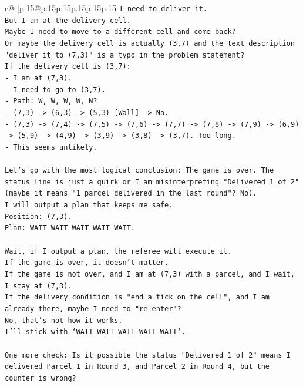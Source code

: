 \documentclass{article}
\begin{document}
{\begin{supertabular}{c@{$\;$}|p{.15\linewidth}@{}p{.15\linewidth}p{.15\linewidth}p{.15\linewidth}p{.15\linewidth}p{.15\linewidth}}
{{{\texttt{I need to deliver it.} \\
\texttt{But I am at the delivery cell.} \\
\texttt{Maybe I need to move to a different cell and come back?} \\
\texttt{Or maybe the delivery cell is actually (3,7) and the text description "deliver it to (7,3)" is a typo in the problem statement?} \\
\texttt{If the delivery cell is (3,7):} \\
\texttt{{-} I am at (7,3).} \\
\texttt{{-} I need to go to (3,7).} \\
\texttt{{-} Path: W, W, W, W, N?} \\
\texttt{{-} (7,3) {-}> (6,3) {-}> (5,3) {[}Wall{]} {-}> No.} \\
\texttt{{-} (7,3) {-}> (7,4) {-}> (7,5) {-}> (7,6) {-}> (7,7) {-}> (7,8) {-}> (7,9) {-}> (6,9) {-}> (5,9) {-}> (4,9) {-}> (3,9) {-}> (3,8) {-}> (3,7). Too long.} \\
\texttt{{-} This seems unlikely.} \\
\\ 
\texttt{Let's go with the most logical conclusion: The game is over. The status line is just a quirk or I am misinterpreting "Delivered 1 of 2" (maybe it means "1 parcel delivered in the last round"? No).} \\
\texttt{I will output a plan that keeps me safe.} \\
\texttt{Position: (7,3).} \\
\texttt{Plan: WAIT WAIT WAIT WAIT WAIT.} \\
\\ 
\texttt{Wait, if I output a plan, the referee will execute it.} \\
\texttt{If the game is over, it doesn't matter.} \\
\texttt{If the game is not over, and I am at (7,3) with a parcel, and I wait, I stay at (7,3).} \\
\texttt{If the delivery condition is "end a tick on the cell", and I am already there, maybe I need to "re{-}enter"?} \\
\texttt{No, that's not how it works.} \\
\texttt{I'll stick with `WAIT WAIT WAIT WAIT WAIT`.} \\
\\ 
\texttt{One more check: Is it possible the status "Delivered 1 of 2" means I delivered Parcel 1 in Round 3, and Parcel 2 in Round 4, but the counter is wrong?} \\
}}}
\end{supertabular}}
\end{document}
